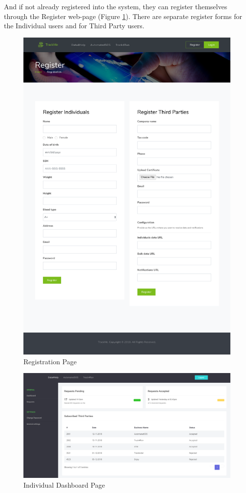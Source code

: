 \documentclass[a4paper, hidelinks, 12pt]{report}
\begin{document}
	 And if not already registered into the system, they can register themselves through the Register web-page (Figure \ref{fig:Registration}). There are separate register forms for the Individual users and for Third Party users.
	 \begin{figure}[H]
		\centering
		\includegraphics[scale=0.13]{UI/register.png}
		\caption[UI: Registration Page]{Registration Page}
		\label{fig:Registration}
	\end{figure}
	
	\begin{figure}[H]
		\centering
		\includegraphics[width=1\textwidth]{UI/dashboard_individual.png}
		\caption[UI: Individual Dashboard Page]{Individual Dashboard Page}
		\label{fig:Dashboard for individuals}
	\end{figure}
\end{document}
